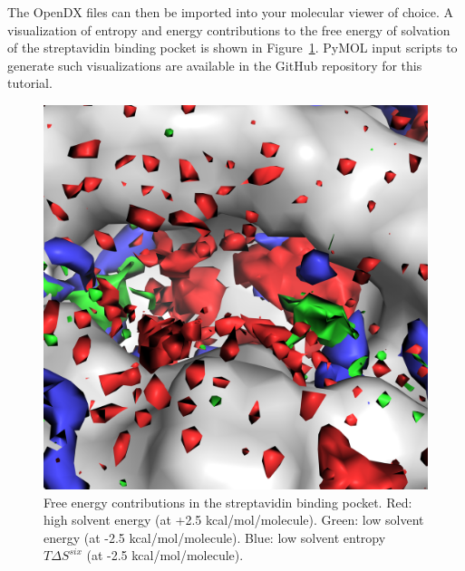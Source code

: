\documentclass[9pt,tutorial]{livecoms}
\begin{document}
The OpenDX files can then be imported into your molecular viewer of choice.
A visualization of entropy and energy contributions to the free energy of solvation of the streptavidin binding pocket is shown in Figure~\ref{fig_binding_pocket_pymol}. PyMOL input scripts to generate such visualizations are available in the GitHub repository for this tutorial.

\begin{figure}
	\centering
	\includegraphics[width=0.8\linewidth]{figures/binding_pocket_norm_quants.png}
	\caption{Free energy contributions in the streptavidin binding pocket. Red: high solvent energy (at +2.5 
	kcal/mol/molecule). Green: low solvent energy (at -2.5 kcal/mol/molecule). Blue: low solvent entropy $T\Delta S^{six}$ 
	(at -2.5 kcal/mol/molecule).}\label{fig_binding_pocket_pymol}
\end{figure}

\end{document}
